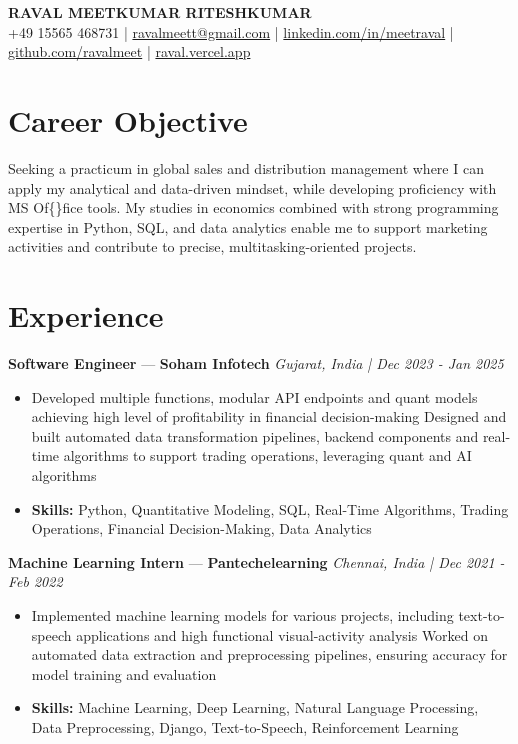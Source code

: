 \documentclass[a4paper,10pt]{article}
\begin{document}
\begin{center}
  {\Large\bfseries RAVAL MEETKUMAR RITESHKUMAR}\\[2pt]
  {\small +49 15565 468731 \;|\; \href{mailto:ravalmeett@gmail.com}{ravalmeett@gmail.com} \;|\; \href{https://www.linkedin.com/in/meetraval/}{linkedin.com/in/meetraval} \;|\; \href{https://github.com/ravalmeet}{github.com/ravalmeet} \;|\; \href{https://raval.vercel.app/}{raval.vercel.app}}
\end{center}
\vspace{-3pt}

\section*{Career Objective}
Seeking a practicum in global sales and distribution management where I can apply my analytical and data-driven mindset, while developing proficiency with MS Of\{\}fice tools. My studies in economics combined with strong programming expertise in Python, SQL, and data analytics enable me to support marketing activities and contribute to precise, multitasking-oriented projects.\par

\section*{Experience}
\textbf{Software Engineer} — \textbf{Soham Infotech} \hfill \textit{Gujarat, India \;|\; Dec 2023 - Jan 2025}\par
\vspace{1pt}
\begin{itemize}
  \item Developed multiple functions, modular API endpoints and quant models achieving high level of profitability in financial decision-making Designed and built automated data transformation pipelines, backend components and real-time algorithms to support trading operations, leveraging quant and AI algorithms
  \item \textbf{Skills:} Python, Quantitative Modeling, SQL, Real-Time Algorithms, Trading Operations, Financial Decision-Making, Data Analytics
\end{itemize}
\vspace{3pt}
\textbf{Machine Learning Intern} — \textbf{Pantechelearning} \hfill \textit{Chennai, India \;|\; Dec 2021 - Feb 2022}\par
\vspace{1pt}
\begin{itemize}
  \item Implemented machine learning models for various projects, including text-to-speech applications and high functional visual-activity analysis Worked on automated data extraction and preprocessing pipelines, ensuring accuracy for model training and evaluation
  \item \textbf{Skills:} Machine Learning, Deep Learning, Natural Language Processing, Data Preprocessing, Django, Text-to-Speech, Reinforcement Learning
\end{itemize}
\end{document}
